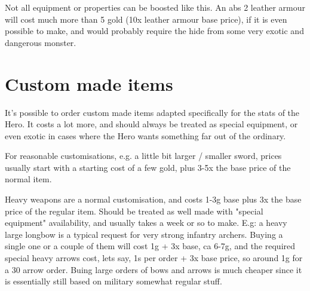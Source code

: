 
Not all equipment or properties can be boosted like this. An abs 2 leather armour will cost much more than 5 gold (10x leather armour base price), if it is even possible to make, and would probably require the hide from some very exotic and dangerous monster.


\section*{Custom made items}
It's possible to order custom made items adapted specifically for the stats of the Hero. It costs a lot more, and should always be treated as special equipment, or even exotic in cases where the Hero wants something far out of the ordinary.

For reasonable customisations, e.g. a little bit larger / smaller sword, prices usually start with a starting cost of a few gold, plus 3-5x the base price of the normal item.

Heavy weapons are a normal customisation, and costs 1-3g base plus 3x the base price of the regular item. Should be treated as well made with "special equipment" availability, and usually takes a week or so to make.
E.g: a heavy large longbow is a typical request for very strong infantry archers. Buying a single one or a couple of them will cost 1g + 3x base, ca 6-7g, and the required special heavy arrows cost, lets say, 1s per order + 3x base price, so around 1g for a 30 arrow order. Buing large orders of bows and arrows is much cheaper since it is essentially still based on military somewhat regular stuff.









